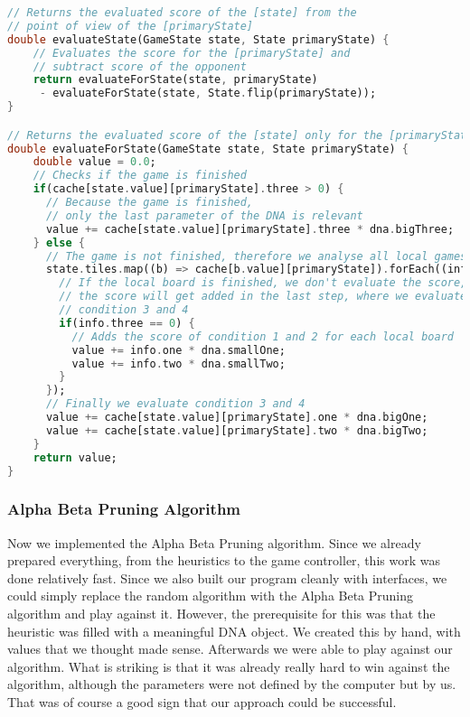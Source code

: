 \begin{lstlisting}[language=Dart,caption={Implementation of the heuristic}]
// Returns the evaluated score of the [state] from the
// point of view of the [primaryState]
double evaluateState(GameState state, State primaryState) {
	// Evaluates the score for the [primaryState] and
	// subtract score of the opponent
    return evaluateForState(state, primaryState)
     - evaluateForState(state, State.flip(primaryState));
}

// Returns the evaluated score of the [state] only for the [primaryState]
double evaluateForState(GameState state, State primaryState) {
    double value = 0.0;
    // Checks if the game is finished
    if(cache[state.value][primaryState].three > 0) {
      // Because the game is finished, 
      // only the last parameter of the DNA is relevant
      value += cache[state.value][primaryState].three * dna.bigThree;
    } else {
      // The game is not finished, therefore we analyse all local games
      state.tiles.map((b) => cache[b.value][primaryState]).forEach((info) {
        // If the local board is finished, we don't evaluate the score, because
        // the score will get added in the last step, where we evaluate
        // condition 3 and 4
        if(info.three == 0) {
       	  // Adds the score of condition 1 and 2 for each local board
          value += info.one * dna.smallOne;
          value += info.two * dna.smallTwo;
        }
      });
      // Finally we evaluate condition 3 and 4
      value += cache[state.value][primaryState].one * dna.bigOne;
      value += cache[state.value][primaryState].two * dna.bigTwo;
    }
    return value;
}
\end{lstlisting}

\subsubsection{Alpha Beta Pruning Algorithm}
Now we implemented the Alpha Beta Pruning algorithm. Since we already prepared everything, from the heuristics to the game controller, this work was done relatively fast. Since we also built our program cleanly with interfaces, we could simply replace the random algorithm with the Alpha Beta Pruning algorithm and play against it. However, the prerequisite for this was that the heuristic was filled with a meaningful DNA object. We created this by hand, with values that we thought made sense. Afterwards we were able to play against our algorithm. What is striking is that it was already really hard to win against the algorithm, although the parameters were not defined by the computer but by us. That was of course a good sign that our approach could be successful.

